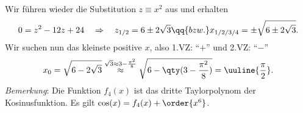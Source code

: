 \begin{enumerate}[label=(\alph*), labelindent=1em,labelsep=0.5cm]
    Wir führen wieder die Substitution $z \equiv x^2$ aus und erhalten 
    \begin{align*}
        0 = z^2 - 12 z + 24 \quad \Rightarrow \quad z_{1/2}= 6\pm2\sqrt{3} \qq{bzw.} x_{1/2/3/4} = \pm \sqrt{6\pm 2\sqrt{3}}.
    \end{align*}
    Wir suchen nun das kleinste positive $x$, also 1.VZ: ``$+$'' und 2.VZ: ``$-$'' 
    \begin{align*}
            x_0 = \sqrt{6-2\sqrt{3}} \overset{\sqrt{3}\approx 3-\frac{\pi^2}{8}}{\approx} \sqrt{6-\qty(3-\frac{\pi^2}{8})} = \uuline{\frac{\pi}{2}}.
    \end{align*}
    \emph{Bemerkung}: Die Funktion $f_4(x)$ ist das dritte Taylorpolynom der Kosinusfunktion. Es gilt $\cos(x) = f_4(x) +\order{x^6}$.
\end{enumerate}

